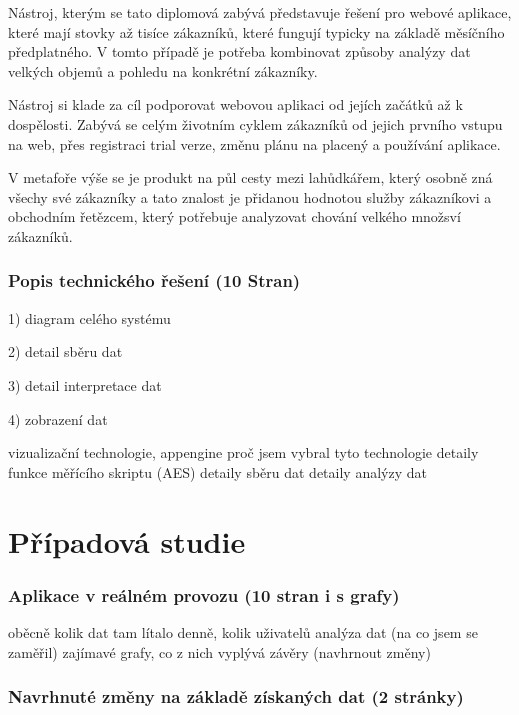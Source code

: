 \documentclass[bc,female,java,dept456]{diploma}						%
\begin{document}
\bigskip

Nástroj, kterým se tato diplomová zabývá představuje řešení pro webové aplikace, které mají stovky až tisíce zákazníků, které fungují typicky na základě měsíčního předplatného. V tomto případě je potřeba kombinovat způsoby analýzy dat velkých objemů a pohledu na konkrétní zákazníky. 

Nástroj si klade za cíl podporovat webovou aplikaci od jejích začátků až k dospělosti. Zabývá se celým životním cyklem zákazníků od jejich prvního vstupu na web, přes registraci trial verze, změnu plánu na placený a používání aplikace.

V metafoře výše se je produkt na půl cesty mezi lahůdkářem, který osobně zná všechy své zákazníky a tato znalost je přidanou hodnotou služby zákazníkovi a obchodním řetězcem, který potřebuje analyzovat chování velkého množsví zákazníků.







\subsubsection{Popis technického řešení (10 Stran)}

1) diagram celého systému

2) detail sběru dat

3) detail interpretace dat

4) zobrazení dat


vizualizační technologie, appengine
proč jsem vybral tyto technologie
detaily funkce měřícího skriptu (AES)
detaily sběru dat
detaily analýzy dat






\section{Případová studie}

\subsubsection{Aplikace v reálném provozu (10 stran i s grafy)}

oběcně kolik dat tam lítalo denně, kolik uživatelů
analýza dat (na co jsem se zaměřil)
zajímavé grafy, co z nich vyplývá
závěry (navhrnout změny)

\subsubsection{Navrhnuté změny na základě získaných dat (2 stránky)}
\end{document}
